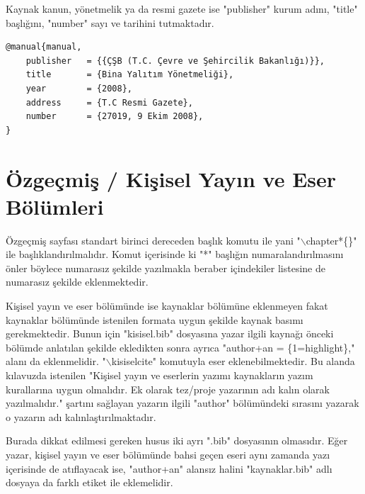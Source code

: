Kaynak kanun, yönetmelik ya da resmi gazete ise "publisher" kurum adını, "title" başlığını, "number" sayı ve tarihini tutmaktadır.

\begin{lstlisting}[language={[LaTeX]{TeX}}, label=bib:kanun, caption={Kaynak kanun, yönetmelik ya da resmi gazete ise}]
@manual{manual,
	publisher   = {{ÇŞB (T.C. Çevre ve Şehircilik Bakanlığı)}},
	title 		= {Bina Yalıtım Yönetmeliği},
	year		= {2008},
	address		= {T.C Resmi Gazete},
	number		= {27019, 9 Ekim 2008},	
}
\end{lstlisting}


\chapter{Özgeçmiş / Kişisel Yayın ve Eser Bölümleri }
\label{ch:ozgec}
Özgeçmiş sayfası standart birinci dereceden başlık komutu ile yani "$\backslash$chapter*\{\}" ile başlıklandırılmalıdır. Komut içerisinde ki "*" başlığın numaralandırılmasını önler böylece numarasız şekilde yazılmakla beraber içindekiler listesine de numarasız şekilde eklenmektedir.

Kişisel yayın ve eser bölümünde ise kaynaklar bölümüne eklenmeyen fakat kaynaklar bölümünde istenilen formata uygun şekilde kaynak basımı gerekmektedir. Bunun için "kisisel.bib" dosyasına yazar ilgili kaynağı önceki bölümde anlatılan şekilde ekledikten sonra ayrıca "author+an = \{1=highlight\}," alanı da eklenmelidir. "$\backslash$kisiselcite{}" komutuyla eser eklenebilmektedir. Bu alanda kılavuzda istenilen "Kişisel yayın ve eserlerin yazımı kaynakların yazım kurallarına uygun olmalıdır. Ek olarak tez/proje yazarının adı kalın olarak yazılmalıdır." şartını sağlayan yazarın ilgili "author" bölümündeki sırasını yazarak o yazarın adı kalınlaştırılmaktadır.

Burada dikkat edilmesi gereken husus iki ayrı ".bib" dosyasının olmasıdır. Eğer yazar, kişisel yayın ve eser bölümünde bahsi geçen eseri aynı zamanda yazı içerisinde de atıflayacak ise, "author+an" alansız halini "kaynaklar.bib" adlı dosyaya da farklı etiket ile eklemelidir.


